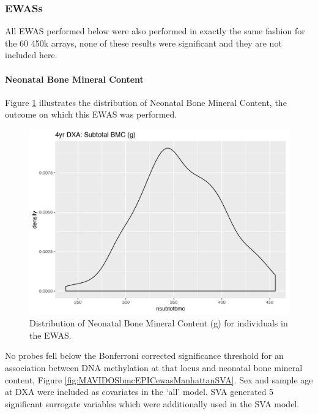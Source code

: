 \documentclass[
]{book}
\begin{document}
\hypertarget{ewass}{%
\subsubsection{EWASs}\label{ewass}}

All EWAS performed below were also performed in exactly the same fashion for the 60 450k arrays, none of these results were significant and they are not included here.

\hypertarget{neonatal-bone-mineral-content}{%
\paragraph{Neonatal Bone Mineral Content}\label{neonatal-bone-mineral-content}}

Figure \ref{fig:MAVIDOSbmc} illustrates the distribution of Neonatal Bone Mineral Content, the outcome on which this EWAS was performed.

\begin{figure}

{\centering \includegraphics[width=0.8\linewidth]{figs/MAVIDOSbmc} 

}

\caption{Distribution of Neonatal Bone Mineral Content (g) for individuals in the EWAS.}\label{fig:MAVIDOSbmc}
\end{figure}



No probes fell below the Bonferroni corrected significance threshold for an association between DNA methylation at that locus and neonatal bone mineral content, Figure \ref{fig:MAVIDOSbmcEPICewasManhattanSVA}.
Sex and sample age at DXA were included as covariates in the `all' model.
SVA generated 5 significant surrogate variables which were additionally used in the SVA model.
\end{document}
